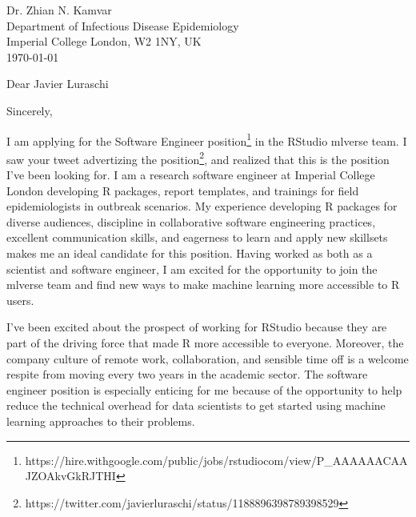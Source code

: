 


\clearpage
\begin{flushright}
  Dr. Zhian N. Kamvar\\
  Department of Infectious Disease Epidemiology\\
  Imperial College London, W2 1NY, UK\\
  \today
\end{flushright}
\date{\today} %
\opening{Dear Javier Luraschi} %
\closing{Sincerely,} %



I am applying for the Software Engineer
position\footnote{https://hire.withgoogle.com/public/jobs/rstudiocom/view/P_AAAAAACAAJZOAkvGkRJTHI}
in the RStudio mlverse team. I saw your tweet advertizing the
position\footnote{https://twitter.com/javierluraschi/status/1188896398789398529},
and realized that this is the position I've been looking for. I am a research
software engineer at Imperial College London developing R packages, report
templates, and trainings for field epidemiologists in outbreak scenarios. My
experience developing R packages for diverse audiences, discipline in
collaborative software engineering practices, excellent communication skills,
and eagerness to learn and apply new skillsets makes me an ideal candidate for
this position. Having worked as both as a scientist and software engineer, I am
excited for the opportunity to join the mlverse team and find new ways to make
machine learning more accessible to R users.  

\vspace{1ex}

I've been excited about the prospect of working for RStudio because they are
part of the driving force that made R more accessible to everyone. Moreover,
the company culture of remote work, collaboration, and sensible time off is a
welcome respite from moving every two years in the academic sector. The
software engineer position is especially enticing for me because of the
opportunity to help reduce the technical overhead for data scientists to get
started using machine learning approaches to their problems.

